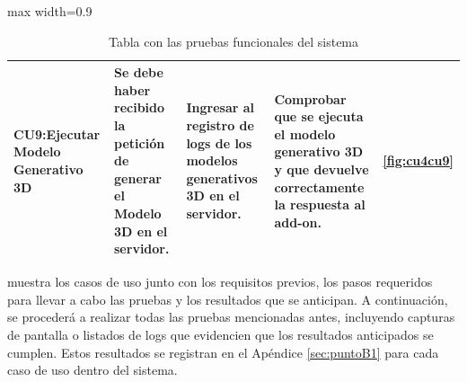 \begin{table}[h!tb]
\begin{adjustbox}{max width=0.9\textwidth}
\begin{tabular}{|p{4cm}|p{4cm}|p{4cm}|p{4cm}|p{2cm}|}
      CU9:Ejecutar Modelo Generativo 3D   & Se debe haber recibido la petición de generar el Modelo 3D en el servidor.  & Ingresar al registro de logs de los modelos generativos 3D en el servidor.                                                                                  & Comprobar que se ejecuta el modelo generativo 3D y que devuelve correctamente la respuesta al add-on.                                   & \ref{fig:cu4cu9}                                   \\ \hline
    \end{tabular}
  \end{adjustbox}
  \caption{Tabla con las pruebas funcionales del sistema}
  \label{tab:pruebasFuncionales}
\end{table}
muestra los casos de uso junto con los requisitos previos, los pasos requeridos para llevar a cabo las pruebas y los resultados que se anticipan.
A continuación, se procederá a realizar todas las pruebas mencionadas antes, incluyendo capturas de pantalla o listados de logs que evidencien que los resultados anticipados se cumplen. Estos resultados se registran en el Apéndice \ref{sec:puntoB1} para cada caso de uso dentro del sistema.









